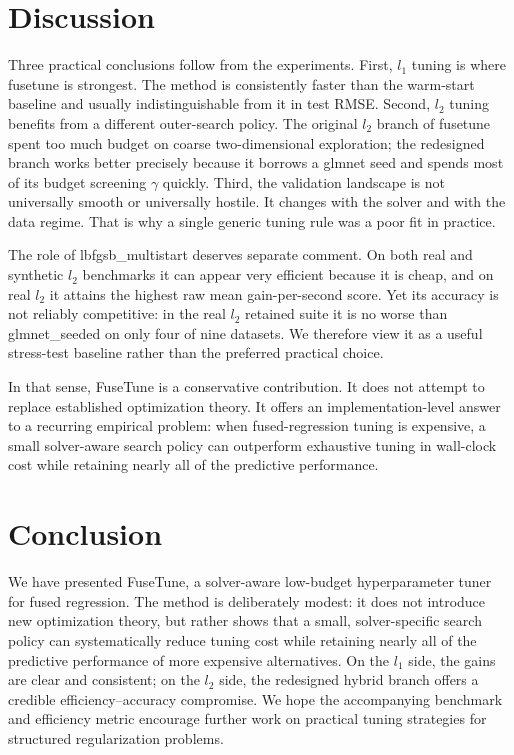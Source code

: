 \documentclass[pdflatex,iicol,sn-mathphys-num]{sn-jnl}
\newcommand{\method}{\textsc{FuseTune}}
\newcommand{\codeid}{\texttt{fusetune}}
\def\textsc#1{#1}%
\def\texttt#1{#1}%
\def\method{FuseTune}%
\def\codeid{fusetune}%
\def\ell{l}%
\begin{document}
\section{Discussion}\label{sec:discussion}
Three practical conclusions follow from the experiments. First, \(\ell_1\) tuning is where \codeid{} is strongest. The method is consistently faster than the warm-start baseline and usually indistinguishable from it in test RMSE. Second, \(\ell_2\) tuning benefits from a different outer-search policy. The original \(\ell_2\) branch of \codeid{} spent too much budget on coarse two-dimensional exploration; the redesigned branch works better precisely because it borrows a \texttt{glmnet} seed and spends most of its budget screening \(\gamma\) quickly. Third, the validation landscape is not universally smooth or universally hostile. It changes with the solver and with the data regime. That is why a single generic tuning rule was a poor fit in practice.

The role of \texttt{lbfgsb\_multistart} deserves separate comment. On both real and synthetic \(\ell_2\) benchmarks it can appear very efficient because it is cheap, and on real \(\ell_2\) it attains the highest raw mean gain-per-second score. Yet its accuracy is not reliably competitive: in the real \(\ell_2\) retained suite it is no worse than \texttt{glmnet\_seeded} on only four of nine datasets. We therefore view it as a useful stress-test baseline rather than the preferred practical choice.

In that sense, \method{} is a conservative contribution. It does not attempt to replace established optimization theory. It offers an implementation-level answer to a recurring empirical problem: when fused-regression tuning is expensive, a small solver-aware search policy can outperform exhaustive tuning in wall-clock cost while retaining nearly all of the predictive performance.

\section{Conclusion}
We have presented \method{}, a solver-aware low-budget hyperparameter tuner for fused regression. The method is deliberately modest: it does not introduce new optimization theory, but rather shows that a small, solver-specific search policy can systematically reduce tuning cost while retaining nearly all of the predictive performance of more expensive alternatives. On the \(\ell_1\) side, the gains are clear and consistent; on the \(\ell_2\) side, the redesigned hybrid branch offers a credible efficiency--accuracy compromise. We hope the accompanying benchmark and efficiency metric encourage further work on practical tuning strategies for structured regularization problems.
\end{document}
